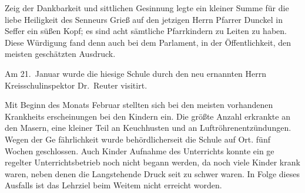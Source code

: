 

Zeig der Dankbarkeit und sittlichen Gesinnung legte ein\ob
kleiner Summe für die liebe Heiligkeit des Senneurs\ob
Grieß auf den jetzigen Herrn Pfarrer Dunckel in Seffer\ohb
ein süßen Kopf; es sind acht sämtliche Pfarrkindern\ob
zu Leiten zu haben. Diese Würdigung fand denn auch\ob
bei dem Parlament, in der Öffentlichkeit, den meisten\ob
geschätzten Ausdruck.

\pend
{}
\pstart

Am 21.\ Januar wurde die hiesige Schule durch den\ob
neu ernannten Herrn Kreisschulinspektor Dr.\ Reuter\ob
visitirt.

\pend
{}
\pstart

Mit Beginn des Monats Februar stellten\ob
sich bei den meisten vorhandenen Krankheits\ohb
erscheinungen bei den Kindern ein. Die\ob
größte Anzahl erkrankte an den Masern,\ob
eine kleiner Teil an Keuchhusten und\ob
an Luftröhrenentzündungen. Wegen der Ge\ohb
fährlichkeit wurde behördlicherseit die Schule auf\ob
Ort. fünf Wochen geschlossen. Auch Kinder\ohb
Aufnahme des Unterrichts konnte ein ge\ohb
regelter Unterrichtsbetrieb noch nicht begann\ob
werden, da noch viele Kinder krank\ob
waren, neben denen die Langstehende Druck\ob
seit zu schwer waren. In Folge dieses Ausfalls\ob
ist das Lehrziel beim Weitem nicht erreicht worden.
\pend
